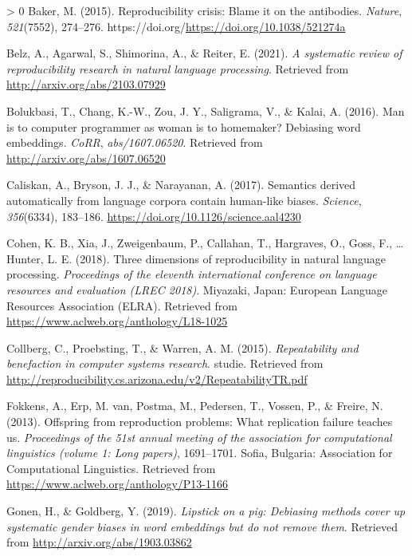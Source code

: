 \documentclass[
  english,
  man,floatsintext]{apa6}
\newlength{\cslhangindent}
\newenvironment{CSLReferences}[3] %
 {%
  \setlength{\parindent}{0pt}
  \ifodd #1 \everypar{\setlength{\hangindent}{\cslhangindent}}\ignorespaces\fi
  \ifnum #2 > 0
  \setlength{\parskip}{#3\baselineskip}
  \fi
 }%
 {}
\begin{document}
\hypertarget{refs}{}
\begin{CSLReferences}{1}{0}
\leavevmode\hypertarget{ref-baker_2015}{}%
Baker, M. (2015). Reproducibility crisis: Blame it on the antibodies. \emph{Nature}, \emph{521}(7552), 274--276. https://doi.org/\url{https://doi.org/10.1038/521274a}

\leavevmode\hypertarget{ref-belz_2021}{}%
Belz, A., Agarwal, S., Shimorina, A., \& Reiter, E. (2021). \emph{A systematic review of reproducibility research in natural language processing}. Retrieved from \url{http://arxiv.org/abs/2103.07929}

\leavevmode\hypertarget{ref-bolukbasi_2016}{}%
Bolukbasi, T., Chang, K.-W., Zou, J. Y., Saligrama, V., \& Kalai, A. (2016). Man is to computer programmer as woman is to homemaker? Debiasing word embeddings. \emph{CoRR}, \emph{abs/1607.06520}. Retrieved from \url{http://arxiv.org/abs/1607.06520}

\leavevmode\hypertarget{ref-caliskan_2017}{}%
Caliskan, A., Bryson, J. J., \& Narayanan, A. (2017). Semantics derived automatically from language corpora contain human-like biases. \emph{Science}, \emph{356}(6334), 183--186. \url{https://doi.org/10.1126/science.aal4230}

\leavevmode\hypertarget{ref-cohen_2018}{}%
Cohen, K. B., Xia, J., Zweigenbaum, P., Callahan, T., Hargraves, O., Goss, F., \ldots{} Hunter, L. E. (2018). Three dimensions of reproducibility in natural language processing. \emph{Proceedings of the eleventh international conference on language resources and evaluation ({LREC} 2018)}. Miyazaki, Japan: European Language Resources Association (ELRA). Retrieved from \url{https://www.aclweb.org/anthology/L18-1025}

\leavevmode\hypertarget{ref-collberg_2015}{}%
Collberg, C., Proebsting, T., \& Warren, A. M. (2015). \emph{Repeatability and benefaction in computer systems research}. studie. Retrieved from \url{http://reproducibility.cs.arizona.edu/v2/RepeatabilityTR.pdf}

\leavevmode\hypertarget{ref-fokkens_2013}{}%
Fokkens, A., Erp, M. van, Postma, M., Pedersen, T., Vossen, P., \& Freire, N. (2013). Offspring from reproduction problems: What replication failure teaches us. \emph{Proceedings of the 51st annual meeting of the association for computational linguistics (volume 1: Long papers)}, 1691--1701. Sofia, Bulgaria: Association for Computational Linguistics. Retrieved from \url{https://www.aclweb.org/anthology/P13-1166}

\leavevmode\hypertarget{ref-gonen_2019}{}%
Gonen, H., \& Goldberg, Y. (2019). \emph{Lipstick on a pig: Debiasing methods cover up systematic gender biases in word embeddings but do not remove them}. Retrieved from \url{http://arxiv.org/abs/1903.03862}


\end{CSLReferences}
\end{document}
